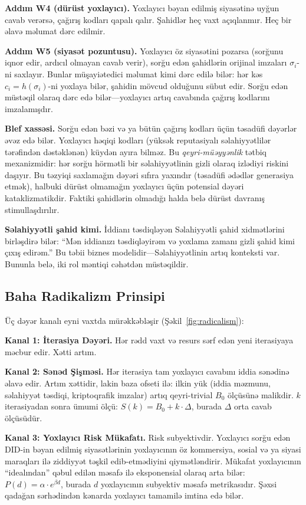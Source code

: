 \documentclass[11pt,a4paper,twocolumn]{article}
\begin{document}
\textbf{Addım W4 (dürüst yoxlayıcı).} Yoxlayıcı bəyan edilmiş siyasətinə uyğun cavab verərsə, çağırış kodları qapalı qalır. Şahidlər heç vaxt açıqlanmır. Heç bir əlavə məlumat dərc edilmir.

\textbf{Addım W5 (siyasət pozuntusu).} Yoxlayıcı öz siyasətini pozarsa (sorğunu iqnor edir, ardıcıl olmayan cavab verir), sorğu edən şahidlərin orijinal imzaları $\sigma_i$-ni saxlayır. Bunlar müşayiətedici məlumat kimi dərc edilə bilər: hər kəs $c_i = h(\sigma_i)$-ni yoxlaya bilər, şahidin mövcud olduğunu sübut edir. Sorğu edən müstəqil olaraq dərc edə bilər---yoxlayıcı artıq cavabında çağırış kodlarını imzalamışdır.

\textbf{Blef xassəsi.} Sorğu edən bəzi və ya bütün çağırış kodları üçün təsadüfi dəyərlər əvəz edə bilər. Yoxlayıcı həqiqi kodları (yüksək reputasiyalı səlahiyyətlilər tərəfindən dəstəklənən) küydən ayıra bilməz. Bu \emph{qeyri-müəyyənlik} tətbiq mexanizmidir: hər sorğu hörmətli bir səlahiyyətlinin gizli olaraq izlədiyi riskini daşıyır. Bu təzyiqi saxlamağın dəyəri sıfıra yaxındır (təsadüfi ədədlər generasiya etmək), halbuki dürüst olmamağın yoxlayıcı üçün potensial dəyəri kataklizmatikdir. Faktiki şahidlərin olmadığı halda belə dürüst davranış stimullaşdırılır.

\textbf{Səlahiyyətli şahid kimi.} İddianı təsdiqləyən Səlahiyyətli şahid xidmətlərini birləşdirə bilər: ``Mən iddianızı təsdiqləyirəm və yoxlama zamanı gizli şahid kimi çıxış edirəm.'' Bu təbii biznes modelidir---Səlahiyyətlinin artıq konteksti var. Bununla belə, iki rol məntiqi cəhətdən müstəqildir.

\subsection{Baha Radikalizm Prinsipi}

Üç dəyər kanalı eyni vaxtda mürəkkəbləşir (Şəkil~\ref{fig:radicalism}):

\textbf{Kanal 1: İterasiya Dəyəri.} Hər rədd vaxt və resurs sərf edən yeni iterasiyaya məcbur edir. Xətti artım.

\textbf{Kanal 2: Sənəd Şişməsi.} Hər iterasiya tam yoxlayıcı cavabını iddia sənədinə əlavə edir. Artım xəttidir, lakin baza ofseti ilə: ilkin yük (iddia məzmunu, səlahiyyət təsdiqi, kriptoqrafik imzalar) artıq qeyri-trivial $B_0$ ölçüsünə malikdir. $k$ iterasiyadan sonra ümumi ölçü: $S(k) = B_0 + k \cdot \Delta$, burada $\Delta$ orta cavab ölçüsüdür.

\textbf{Kanal 3: Yoxlayıcı Risk Mükafatı.} Risk subyektivdir. Yoxlayıcı sorğu edən DID-in bəyan edilmiş siyasətlərinin yoxlayıcının öz kommersiya, sosial və ya siyasi maraqları ilə ziddiyyət təşkil edib-etmədiyini qiymətləndirir. Mükafat yoxlayıcının ``idealından'' qəbul edilən məsafə ilə eksponensial olaraq arta bilər: $P(d) = \alpha \cdot e^{\beta d}$, burada $d$ yoxlayıcının subyektiv məsafə metrikasıdır. Şəxsi qadağan sərhədindən kənarda yoxlayıcı tamamilə imtina edə bilər.
\end{document}
